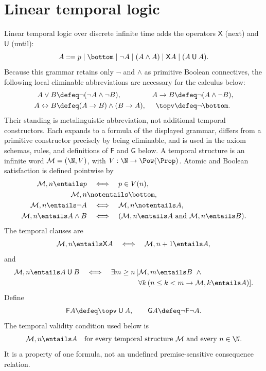 \section{Linear temporal logic}
\label{sec:modal-temporal-epistemic-02}

Linear temporal logic over discrete infinite time adds the operators
\(\mathsf X\) (next) and \(\mathbin{\mathsf U}\) (until):
\[
  A::=p\mid\bottom\mid\neg A\mid(A\land A)\mid\mathsf X A\mid
       (A\mathbin{\mathsf U}A).
\]
Because this grammar retains only \(\neg\) and \(\land\) as primitive Boolean
connectives, the following local eliminable abbreviations are necessary for the
calculus below:
\[
\begin{aligned}
  A\lor B&\defeq\neg(\neg A\land\neg B),
  & A\to B&\defeq\neg(A\land\neg B),\\
  A\leftrightarrow B&\defeq(A\to B)\land(B\to A),
  & \topv&\defeq\neg\bottom.
\end{aligned}
\]
Their standing is metalinguistic abbreviation, not additional temporal
constructors.  Each expands to a formula of the displayed grammar, differs
from a primitive constructor precisely by being eliminable, and is used in the
axiom schemas, rules, and definitions of \(\mathsf F\) and \(\mathsf G\) below.
A temporal structure is an infinite word
\(\mathcal M=(\N,V)\), with
\(V:\N\to\Pow(\Prop)\).  Atomic and Boolean satisfaction is defined
pointwise by
\[
\begin{aligned}
  \mathcal M,n\entails p
    &\quad\Longleftrightarrow\quad p\in V(n),\\
  \mathcal M,n&\notentails\bottom,\\
  \mathcal M,n\entails\neg A
    &\quad\Longleftrightarrow\quad\mathcal M,n\notentails A,\\
  \mathcal M,n\entails A\land B
    &\quad\Longleftrightarrow\quad
      (\mathcal M,n\entails A\text{ and }\mathcal M,n\entails B).
\end{aligned}
\]
The temporal clauses are
\[
  \mathcal M,n\entails\mathsf X A
  \quad\Longleftrightarrow\quad
  \mathcal M,n+1\entails A,
\]
and
\[
\begin{aligned}
  \mathcal M,n\entails A\mathbin{\mathsf U}B
  \quad\Longleftrightarrow\quad
  \exists m\geq n\,[&\mathcal M,m\entails B\ \land{}\\
   &\forall k\,(n\leq k<m\to\mathcal M,k\entails A)].
\end{aligned}
\]
Define
\[
  \mathsf F A\defeq\topv\mathbin{\mathsf U}A,
  \qquad
  \mathsf G A\defeq\neg\mathsf F\neg A.
\]
The temporal validity condition used below is
\[
  \mathcal M,n\entails A
  \quad\text{for every temporal structure \(\mathcal M\) and every
  \(n\in\N\)}.
\]
It is a property of one formula, not an undefined premise-sensitive consequence
relation.

